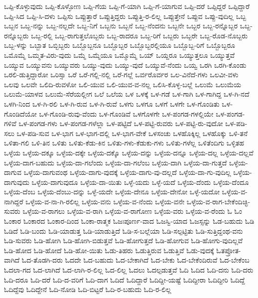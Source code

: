 {ಒಪ್ಪಿ-ಕೊಳ್ಳುವುದು
ಒಪ್ಪಿ-ಕೊಳ್ಳೋಣ
ಒಪ್ಪಿ-ಗೆಯ
ಒಪ್ಪಿ-ಗೆ-ಯಾಗಿ
ಒಪ್ಪಿ-ಗೆ-ಯಾಗುವ
ಒಪ್ಪಿ-ದರೆ
ಒಪ್ಪಿದ್ದರೆ
ಒಪ್ಪಿದ್ದಾರೆ
ಒಪ್ಪಿ-ಸಿದ
ಒಪ್ಪಿ-ಸಿ-ದಳು
ಒಪ್ಪಿಸು
ಒಪ್ಪುತ್ತಾರೆ
ಒಪ್ಪುತ್ತಿದ್ದರು
ಒಪ್ಪುತ್ತಿ-ರ-ಲಿಲ್ಲ
ಒಪ್ಪುತ್ತೇನೆ
ಒಪ್ಪುವ
ಒಪ್ಪು-ವುದಿಲ್ಲ
ಒಬ್ಬ
ಒಬ್ಬನ
ಒಬ್ಬ-ನನ್ನು
ಒಬ್ಬ-ನಲ್ಲದೇ
ಒಬ್ಬ-ನಿಗೆ
ಒಬ್ಬನು
ಒಬ್ಬನೆ
ಒಬ್ಬ-ನೆಂದನು
ಒಬ್ಬನೇ
ಒಬ್ಬರ
ಒಬ್ಬ-ರನ್ನೊಬ್ಬರ
ಒಬ್ಬ-ರನ್ನೊಬ್ಬರು
ಒಬ್ಬ-ರಲ್ಲಿ
ಒಬ್ಬ-ರಾಗುತ್ತಲೊಬ್ಬರು
ಒಬ್ಬ-ರಾದರೂ
ಒಬ್ಬ-ರಿಗೆ
ಒಬ್ಬರು
ಒಬ್ಬರೇ
ಒಬ್ಬ-ರೊಡ-ನೊಬ್ಬರು
ಒಬ್ಬ-ಳನ್ನು
ಒಬ್ಬಾತ
ಒಬ್ಬಿಬ್ಬರು
ಒಬ್ಬೊಬ್ಬನೂ
ಒಬ್ಬೊಬ್ಬರ
ಒಬ್ಬೊಬ್ಬರಲ್ಲಿಯೂ
ಒಬ್ಬೊಬ್ಬ-ರಿಗೆ
ಒಬ್ಬೊಬ್ಬರೂ
ಒಮೊಮ್ಮೆ
ಒಮ್ಮತ-ವಿರು-ವುದು
ಒಮ್ಮೆ
ಒಮ್ಮೆಯೂ
ಒಮ್ಮೊಮ್ಮೆ
ಒಯ್
ಒಯ್ದರೂ
ಒಯ್ಯುತ್ತಲೂ
ಒಯ್ಯುತ್ತವೆ
ಒಯ್ಯುವ
ಒಯ್ಯುವನು
ಒಯ್ಯುವರು
ಒಯ್ಯು-ವುದು
ಒಯ್ಯು-ವುದೆ
ಒಯ್ಯುವೆ-ನೆಂದು
ಒಯ್ವ
ಒರಗಿ
ಒರಗಿ-ಕೊಂಡು
ಒರಲಿ-ಡುತ್ತಿದ್ದಾರೋ
ಒರಿಸ್ಸಾ
ಒರೆ
ಒರೆ-ಗಲ್ಲಿ-ನಲ್ಲಿ
ಒರೆ-ಗಲ್ಲೆ
ಒರ್ವರೊರ್ವರ
ಒಲ-ವಿನೆದೆ-ಗಳು
ಒಲವೀ-ವಳು
ಒಲವು
ಒಲವೇ
ಒಲಿದಿ-ರುವಳೋ
ಒಲಿ-ಯುವ
ಒಲಿ-ಯುವ-ವ-ನಲ್ಲ
ಒಲಿಸಿ-ಕೊಳ್ಳ-ಬಲ್ಲೆ
ಒಲುಮೆ
ಒಲುಮೆಯ
ಒಲುಮೆ-ಯಾಳವ
ಒಲುಮೆ-ಸೆರೆಯಲ್ಲೀಗ
ಒಲೆ
ಒಲೆಯ
ಒಳ
ಒಳಕ್ಕೆ
ಒಳ-ಗಡೆ
ಒಳ-ಗಾಗಿ
ಒಳ-ಗಾಗಿದ್ದ
ಒಳ-ಗಿ-ನದೆ
ಒಳಗಿ-ನಿಂದ
ಒಳ-ಗಿ-ರಲಿ
ಒಳ-ಗಿ-ರುವ
ಒಳ-ಗಿ-ರುವೆ
ಒಳಗು
ಒಳಗೂ
ಒಳಗೆ
ಒಳಗೇ
ಒಳ-ಗೊಂಡಿತು
ಒಳ-ಗೊಂಡಿದೆಯೋ
ಒಳ-ಗೊಂಡಿ-ರುವು-ವೆಂದು
ಒಳ-ಗೊಂಡಿವೆ
ಒಳಗೊಳಗೇ
ಒಳ-ಪಂಗಡ-ಗಳಲ್ಲಿಯೇ
ಒಳ-ಪಂಗಡ-ಗಳಿವೆ
ಒಳ-ಪಂಗಡ-ಗಳು
ಒಳ-ಪಂಗಡ-ಗಳೆಲ್ಲಾ
ಒಳ-ಪಟ್ಟಿದೆ
ಒಳ-ಪಟ್ಟಿ-ರುವರು
ಒಳ-ಪಟ್ಟಿ-ರು-ವುದೋ
ಒಳ-ಪಡಿ-ಸಲು
ಒಳ-ಪಡಿ-ಸುವ
ಒಳ-ಭಾಗ
ಒಳ-ಭಾಗ-ದಲ್ಲಿ
ಒಳ-ಭಾಗ-ವೇಕೆ
ಒಳಸಂಚು
ಒಳಹೊಕ್ಕಿಲ್ಲ
ಒಳಹೊಕ್ಕು
ಒಳಿ-ತನೆ
ಒಳಿತಾ-ಗಲಿ
ಒಳಿ-ತಿನ
ಒಳಿತು
ಒಳಿತು-ಕೆಡು-ಕಿನ
ಒಳಿತು-ಗಳು-ಕೆಡುಕು-ಗಳು
ಒಳಿತು-ಗಳೆಲ್ಲ
ಒಳಿತೆಂದಿಗು
ಒಳ್ಳಿತಹ
ಒಳ್ಳೆಯ
ಒಳ್ಳೆಯ-ದಕ್ಕೂ
ಒಳ್ಳೆಯ-ದಕ್ಕೇ
ಒಳ್ಳೆಯ-ದಕ್ಕೊ
ಒಳ್ಳೆಯ-ದನ್ನು
ಒಳ್ಳೆಯ-ದನ್ನೂ
ಒಳ್ಳೆಯ-ದಲ್ಲ
ಒಳ್ಳೆಯ-ದಲ್ಲವೆ
ಒಳ್ಳೆಯ-ದಾಗ-ಬಹುದು
ಒಳ್ಳೆಯ-ದಾ-ಗಲೆಂದು
ಒಳ್ಳೆಯ-ದಾ-ಗಲೆಂಬ
ಒಳ್ಳೆಯ-ದಾಗಿ
ಒಳ್ಳೆಯ-ದಾ-ಗುತ್ತದೆ
ಒಳ್ಳೆಯ-ದಾಗುವ
ಒಳ್ಳೆಯ-ದಾಗುವಂಥ
ಒಳ್ಳೆಯ-ದಾಗು-ವುದಕ್ಕೆ
ಒಳ್ಳೆಯ-ದಾಗು-ವು-ದಲ್ಲದೆ
ಒಳ್ಳೆಯ-ದಾ-ಗು-ವುದಿಲ್ಲ
ಒಳ್ಳೆಯ-ದಾಗುವುದು
ಒಳ್ಳೆಯ-ದಾಗುವುದೂ
ಒಳ್ಳೆಯ-ದಾ-ಯಿತು
ಒಳ್ಳೆ-ಯದು
ಒಳ್ಳೆ-ಯದೆ
ಒಳ್ಳೆಯ-ದೆಂದು
ಒಳ್ಳೆಯ-ದೆಂದೂ
ಒಳ್ಳೆಯ-ದೆಂಬ
ಒಳ್ಳೆಯ-ದೆಂಬು-ದನ್ನು
ಒಳ್ಳೆ-ಯದೇ
ಒಳ್ಳೆಯ-ದೇನೂ
ಒಳ್ಳೆಯ-ದೇನೋ
ಒಳ್ಳೆ-ಯದೋ
ಒಳ್ಳೆಯ-ವ-ನಾಗಿದ್ದರೆ
ಒಳ್ಳೆಯ-ವ-ನಾ-ಗಿ-ರಲಿಲ್ಲ
ಒಳ್ಳೆಯ-ವನು
ಒಳ್ಳೆಯ-ವ-ನೆಂದು
ಒಳ್ಳೆಯ-ವನೇ
ಒಳ್ಳೆಯ-ವ-ರಾಗ-ಬೇಕೆಂದಿಚ್ಛಿ-ಸುವರು
ಒಳ್ಳೆಯ-ವ-ರಾಗಲು
ಒಳ್ಳೆಯ-ವ-ರಾಗಿ
ಒಳ್ಳೆಯ-ವ-ರಾಗೋಣ
ಒಳ್ಳೆಯ-ವರು
ಒಳ್ಳೆಯ-ವ-ರೆಂದು
ಓ
ಓಂ
ಓಂಕಾರ
ಓಂಕಾರದ
ಓಂಕಾರ-ದಿಂದ
ಓಂಕಾ-ರಾತ್ಮಕ
ಓಜಃಪೂರ್ಣ-ವಾದ
ಓಜಸ್ವಿ-ಯಾದ
ಓಜಸ್ಸನ್ನು
ಓಡ-ಬಹುದು
ಓಡಿ
ಓಡಿದೆ
ಓಡಿ-ಬಂದು
ಓಡಿ-ಯಾಡುತ್ತ
ಓಡಿ-ಯಾಡುತ್ತಿದೆ
ಓಡಿ-ಸ-ಬಲ್ಲೆಯಾ
ಓಡಿ-ಸಲ್ಪಟ್ಟಿತು
ಓಡಿ-ಸುತ್ತಿದ್ದಂಥ-ವನು
ಓಡಿ-ಸುವರು
ಓಡಿ-ಹೋಗಿ
ಓಡಿ-ಹೋಗಿ-ಬಿಡುತ್ತವೆ
ಓಡಿ-ಹೋಗುತ್ತದೆ
ಓಡಿ-ಹೋಗುವ
ಓಡಿ-ಹೋಗು-ವುದಿಲ್ಲವೆ
ಓಡಿ-ಹೋದ
ಓಡಿ-ಹೋದೆ
ಓಡಿ-ಹೋ-ಯಿತು
ಓಡು-ತಿಹರು
ಓಡುತ್ತಿರುವ
ಓಡುತ್ತಿವೆ
ಓಡು-ವುದಕ್ಕೆ
ಓತಪ್ರೋತ-ವಾಗಿದೆ
ಓದ-ತೊಡಗಿ-ದರು
ಓದದೇ
ಓದ-ಬಹುದು
ಓದ-ಬೇಕಾಗಿದೆ
ಓದ-ಬೇಕು
ಓದ-ಬೇಕೆಂದಿರುವೆ
ಓದ-ಬೇಕೆಂಬ
ಓದಲಾ-ಗದ
ಓದ-ಲಾಗಿದೆ
ಓದ-ಲಾಗಿ-ರ-ಲಿಲ್ಲ
ಓದ-ಲಿಲ್ಲ
ಓದಲು
ಓದಲ್ಪಡುತ್ತವೆ
ಓದಿ
ಓದಿದ
ಓದಿ-ದನು
ಓದಿ-ದರು
ಓದಿ-ದರೂ
ಓದಿ-ದರೆ
ಓದಿ-ದ-ವರಿಗೆ
ಓದಿ-ದಾಗ
ಓದಿದೆ
ಓದಿದ್ದಾರೆ
ಓದಿದ್ದೀ-ಯಷ್ಟೆ
ಓದಿದ್ದೀರಾ
ಓದಿದ್ದೀರಿ
ಓದಿದ್ದೆ
ಓದಿದ್ದೆವು
ಓದಿದ್ದೇನೆ
ಓದಿ-ನೋಡಿ
ಓದಿ-ಬಿಟ್ಟರೆ
ಓದಿ-ರ-ಬಹುದು
ಓದಿ-ರ-ಲಿಲ್ಲ
}
